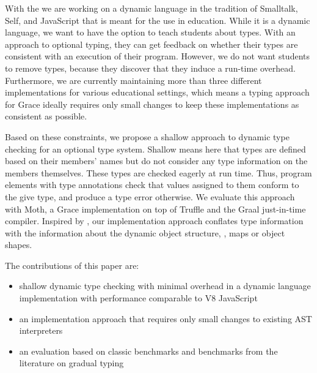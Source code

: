 
With the 
we are working on a dynamic language in the tradition of
Smalltalk\citep{Smalltalk80}, Self\citep{Self}, and JavaScript
that is meant for the use in education.
While it is a dynamic language,
we want to have the option to teach students about types.
With an approach to optional typing,
they can get feedback on whether their types are consistent
with an execution of their program.
However, we do not want students to remove types,
because they discover that they induce a run-time overhead.
Furthermore, we are currently maintaining more than three different implementations
for various educational settings,
which means a typing approach for Grace ideally requires only small changes
to keep these implementations as consistent as possible.

Based on these constraints,
we propose a shallow approach to dynamic type checking
for an optional type system.
Shallow means here that types are defined based on their members' names
but do not consider any type information on the members themselves.
These types are checked eagerly at run time.
Thus, program elements with type annotations check
that values assigned to them conform to the give type,
and produce a type error otherwise.
We evaluate this approach with Moth,
a Grace implementation on top of Truffle
and the Graal just-in-time compiler\citep{Wurthinger2013,Wurthinger:2017:PPE}.
Inspired by \citet{Richards2017,Bauman2017},
our implementation approach conflates type information
with the information about the dynamic object structure,
\ie, maps\citep{Self} or object shapes\citep{woss2014object}.



The contributions of this paper are:

\begin{itemize}
\item shallow dynamic type checking with minimal overhead
      in a dynamic language implementation
      with performance comparable to V8 JavaScript
\item an implementation approach that requires
      only small changes to existing AST interpreters
\item an evaluation based on classic benchmarks
      and benchmarks from the literature on gradual typing
\end{itemize}
